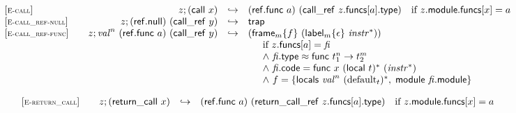 \vspace{1ex}

$$
\begin{array}[t]{@{}lrcl@{}l@{}}
{[\textsc{\scriptsize E{-}call}]} \quad & z ; (\mathsf{call}~x) & \hookrightarrow & (\mathsf{ref{.}func}~a)~(\mathsf{call\_ref}~z{.}\mathsf{funcs}{}[a]{.}\mathsf{type}) & \quad \mbox{if}~ z{.}\mathsf{module}{.}\mathsf{funcs}{}[x] = a \\
{[\textsc{\scriptsize E{-}call\_ref{-}null}]} \quad & z ; (\mathsf{ref{.}null})~(\mathsf{call\_ref}~y) & \hookrightarrow & \mathsf{trap} \\
{[\textsc{\scriptsize E{-}call\_ref{-}func}]} \quad & z ; {{\mathit{val}}^{n}}~(\mathsf{ref{.}func}~a)~(\mathsf{call\_ref}~y) & \hookrightarrow & ({{\mathsf{frame}}_{m}}{\{ f \}}~({{\mathsf{label}}_{m}}{\{ \epsilon \}}~{{\mathit{instr}}^\ast})) &  \\
&&& \multicolumn{2}{@{}l@{}}{\quad
\quad
\begin{array}[t]{@{}l@{}}
\mbox{if}~ z{.}\mathsf{funcs}{}[a] = {\mathit{fi}} \\
{\land}~ {\mathit{fi}}{.}\mathsf{type} \approx \mathsf{func}~{t_1^{n}} \rightarrow {t_2^{m}} \\
{\land}~ {\mathit{fi}}{.}\mathsf{code} = \mathsf{func}~x~{(\mathsf{local}~t)^\ast}~({{\mathit{instr}}^\ast}) \\
{\land}~ f = \{ \mathsf{locals}~{{\mathit{val}}^{n}}~{({{\mathrm{default}}}_{t})^\ast},\;\allowbreak \mathsf{module}~{\mathit{fi}}{.}\mathsf{module} \} \\
\end{array}
} \\
\end{array}
$$

\vspace{1ex}

$$
\begin{array}[t]{@{}lrcl@{}l@{}}
{[\textsc{\scriptsize E{-}return\_call}]} \quad & z ; (\mathsf{return\_call}~x) & \hookrightarrow & (\mathsf{ref{.}func}~a)~(\mathsf{return\_call\_ref}~z{.}\mathsf{funcs}{}[a]{.}\mathsf{type}) & \quad \mbox{if}~ z{.}\mathsf{module}{.}\mathsf{funcs}{}[x] = a \\
\end{array}
$$

\vspace{1ex}

